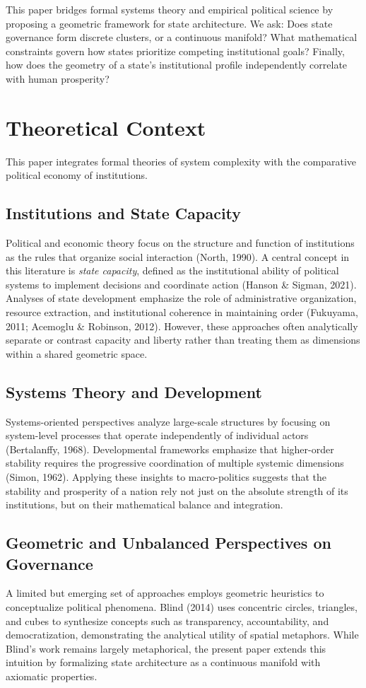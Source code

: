 \documentclass[12pt]{article}
\begin{document}
This paper bridges formal systems theory and empirical political science by proposing a geometric framework for state architecture. We ask: Does state governance form discrete clusters, or a continuous manifold? What mathematical constraints govern how states prioritize competing institutional goals? Finally, how does the geometry of a state's institutional profile independently correlate with human prosperity?

\section{Theoretical Context}

This paper integrates formal theories of system complexity with the comparative political economy of institutions.

\subsection{Institutions and State Capacity}
Political and economic theory focus on the structure and function of institutions as the rules that organize social interaction (North, 1990). A central concept in this literature is \textit{state capacity}, defined as the institutional ability of political systems to implement decisions and coordinate action (Hanson \& Sigman, 2021). Analyses of state development emphasize the role of administrative organization, resource extraction, and institutional coherence in maintaining order (Fukuyama, 2011; Acemoglu \& Robinson, 2012). However, these approaches often analytically separate or contrast capacity and liberty rather than treating them as dimensions within a shared geometric space.

\subsection{Systems Theory and Development}
Systems-oriented perspectives analyze large-scale structures by focusing on system-level processes that operate independently of individual actors (Bertalanffy, 1968). Developmental frameworks emphasize that higher-order stability requires the progressive coordination of multiple systemic dimensions (Simon, 1962). Applying these insights to macro-politics suggests that the stability and prosperity of a nation rely not just on the absolute strength of its institutions, but on their mathematical balance and integration.

\subsection{Geometric and Unbalanced Perspectives on Governance}
A limited but emerging set of approaches employs geometric heuristics to conceptualize political phenomena. Blind (2014) uses concentric circles, triangles, and cubes to synthesize concepts such as transparency, accountability, and democratization, demonstrating the analytical utility of spatial metaphors. While Blind’s work remains largely metaphorical, the present paper extends this intuition by formalizing state architecture as a continuous manifold with axiomatic properties.
\end{document}

